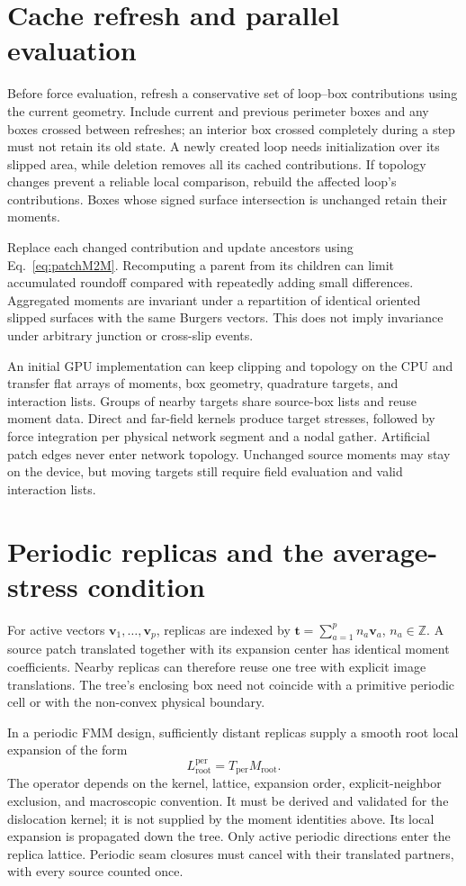 \section{Cache refresh and parallel evaluation}
Before force evaluation, refresh a conservative set of loop--box contributions using the current geometry. Include current and previous perimeter boxes and any boxes crossed between refreshes; an interior box crossed completely during a step must not retain its old state. A newly created loop needs initialization over its slipped area, while deletion removes all its cached contributions. If topology changes prevent a reliable local comparison, rebuild the affected loop's contributions. Boxes whose signed surface intersection is unchanged retain their moments.

Replace each changed contribution and update ancestors using Eq.~\eqref{eq:patchM2M}. Recomputing a parent from its children can limit accumulated roundoff compared with repeatedly adding small differences. Aggregated moments are invariant under a repartition of identical oriented slipped surfaces with the same Burgers vectors. This does not imply invariance under arbitrary junction or cross-slip events.

An initial GPU implementation can keep clipping and topology on the CPU and transfer flat arrays of moments, box geometry, quadrature targets, and interaction lists. Groups of nearby targets share source-box lists and reuse moment data. Direct and far-field kernels produce target stresses, followed by force integration per physical network segment and a nodal gather. Artificial patch edges never enter network topology. Unchanged source moments may stay on the device, but moving targets still require field evaluation and valid interaction lists.

\section{Periodic replicas and the average-stress condition}
For active vectors $\bm v_1,\ldots,\bm v_p$, replicas are indexed by
$\bm t=\sum_{a=1}^p n_a\bm v_a$, $n_a\in\mathbb Z$. A source patch translated together with its expansion center has identical moment coefficients. Nearby replicas can therefore reuse one tree with explicit image translations. The tree's enclosing box need not coincide with a primitive periodic cell or with the non-convex physical boundary.

In a periodic FMM design, sufficiently distant replicas supply a smooth root local expansion of the form
\begin{equation}
 L_{\mathrm{root}}^{\mathrm{per}}=T_{\mathrm{per}}M_{\mathrm{root}}.
\end{equation}
The operator depends on the kernel, lattice, expansion order, explicit-neighbor exclusion, and macroscopic convention. It must be derived and validated for the dislocation kernel; it is not supplied by the moment identities above. Its local expansion is propagated down the tree. Only active periodic directions enter the replica lattice. Periodic seam closures must cancel with their translated partners, with every source counted once.

